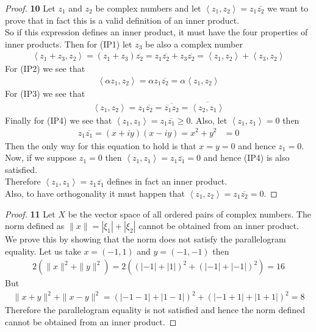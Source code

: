 \documentclass[11pt]{article}
\newcommand{\inprd}[1]{\left\langle{#1}\right\rangle}
\theoremstyle{definition}
\begin{document}
\cleardoublepage
\begin{proof}{\textbf{10}}
Let $z_1$ and $z_2$ be complex numbers and let
$\inprd{z_1, z_2} = z_1\overline{z_2}$ we want to prove that in fact this
is a valid definition of an inner product.\\
So if this expression defines an inner product, it must have the four
properties of inner products.
Then for (IP1) let $z_3$ be also a complex number
\begin{align*}
    \inprd{z_1 + z_3, z_2} = (z_1 + z_3)\overline{z_2} 
    = z_1\overline{z_2} + z_3\overline{z_2}
    = \inprd{z_1, z_2} + \inprd{z_3, z_2}
\end{align*}
For (IP2) we see that
\begin{align*}
    \inprd{\alpha z_1, z_2} = \alpha z_1\overline{z_2}
    = \alpha\inprd{z_1, z_2}
\end{align*}
For (IP3) we see that
\begin{align*}
    \inprd{z_1, z_2} = z_1\overline{z_2}
    = \overline{\overline{z_1}z_2}
    = \overline{\inprd{z_2, z_1}}
\end{align*}
Finally for (IP4) we see that $\inprd{z_1, z_1} = z_1\overline{z_1} \geq 0$.
Also, let $\inprd{z_1, z_1} = 0$ then
\begin{align*}
    z_1\overline{z_1} =
    (x + iy)(x - iy) =
    x^2 + y^2 &= 0
\end{align*}
Then the only way for this equation to hold is that $x = y = 0$ and hence
$z_1 = 0$.
Now, if we suppose $z_1 = 0$ then
$\inprd{z_1, z_1} = z_1\overline{z_1} = 0$ and hence (IP4) is also
satisfied.\\
Therefore $\inprd{z_1, z_1} = z_1\overline{z_1}$ defines in fact an inner
product.\\
Also, to have orthogonality it must happen that
$\inprd{z_1, z_2} = z_1\overline{z_2} = 0$.
\end{proof}

\cleardoublepage
\begin{proof}{\textbf{11}}
Let $X$ be the vector space of all ordered pairs of complex numbers.
The norm defined as $\|x\| = |\xi_1| + |\xi_2|$ cannot be obtained from an
inner product. We prove this by showing that the norm does not satisfy the
parallelogram equality. Let us take $x = (-1, 1)$ and $y = (-1, -1)$
then
\begin{align*}
    2(\|x\|^2 + \|y\|^2) = 2((|-1| + |1|)^2 + (|-1| + |-1|)^2) = 16
\end{align*}
But 
\begin{align*}
    \|x+y\|^2 + \|x-y\|^2 = (|-1 -1| + |1 - 1|)^2 + (|-1 + 1| + |1 + 1|)^2
    = 8  
\end{align*}
Therefore the parallelogram equality is not satisfied and hence the norm
defined cannot be obtained from an inner product.
\end{proof}
\end{document}
